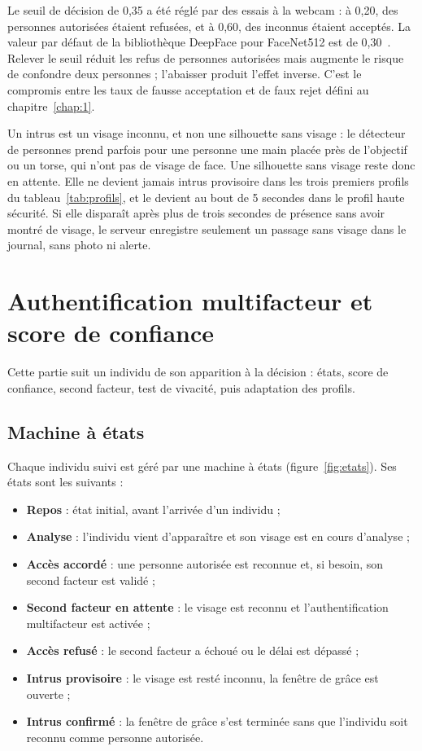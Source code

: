 \begin{maj}
Le seuil de décision de 0,35 a été réglé par des essais à la webcam : à 0,20, des personnes autorisées étaient refusées, et à 0,60, des inconnus étaient acceptés. La valeur par défaut de la bibliothèque DeepFace pour FaceNet512 est de 0,30~\cite{serengil_deepface_thresholds}. Relever le seuil réduit les refus de personnes autorisées mais augmente le risque de confondre deux personnes ; l'abaisser produit l'effet inverse. C'est le compromis entre les taux de fausse acceptation et de faux rejet défini au chapitre~\ref{chap:1}.

Un intrus est un visage inconnu, et non une silhouette sans visage : le détecteur de personnes prend parfois pour une personne une main placée près de l'objectif ou un torse, qui n'ont pas de visage de face. Une silhouette sans visage reste donc en attente. Elle ne devient jamais intrus provisoire dans les trois premiers profils du tableau~\ref{tab:profils}, et le devient au bout de 5 secondes dans le profil haute sécurité. Si elle disparaît après plus de trois secondes de présence sans avoir montré de visage, le serveur enregistre seulement un passage sans visage dans le journal, sans photo ni alerte.
\end{maj}

\section{Authentification multifacteur et score de confiance}\label{sec:mfa}

Cette partie suit un individu de son apparition à la décision : états, score de confiance, second facteur, test de vivacité, puis adaptation des profils.

\subsection{Machine à états}

Chaque individu suivi est géré par une machine à états (figure~\ref{fig:etats}). Ses états sont les suivants :
\begin{itemize}
  \item \textbf{Repos} : état initial, avant l'arrivée d'un individu ;
  \item \textbf{Analyse} : l'individu vient d'apparaître et son visage est en cours d'analyse ;
  \item \textbf{Accès accordé} : une personne autorisée est reconnue et, si besoin, son second facteur est validé ;
  \item \textbf{Second facteur en attente} : le visage est reconnu et l'authentification multifacteur est activée ;
  \item \textbf{Accès refusé} : le second facteur a échoué ou le délai est dépassé ;
  \item \textbf{Intrus provisoire} : le visage est resté inconnu, la fenêtre de grâce est ouverte ;
  \item \textbf{Intrus confirmé} : la fenêtre de grâce s'est terminée sans que l'individu soit reconnu comme personne autorisée.
\end{itemize}

